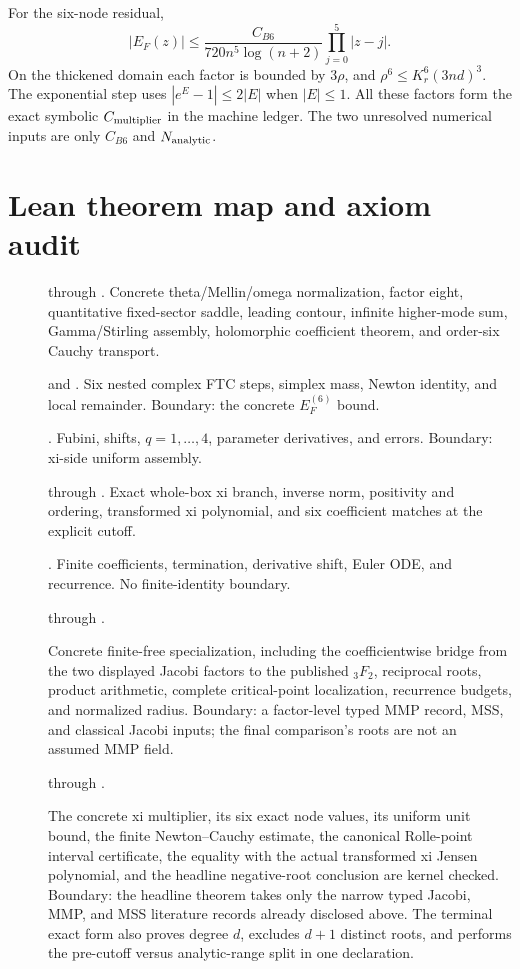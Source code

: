 \documentclass[10pt]{article}
\begin{document}
For the six-node residual,
\[
 |E_F(z)|\le\frac{C_{B6}}{720n^5\log(n+2)}
 \prod_{j=0}^{5}|z-j|.
\]
On the thickened domain each factor is bounded by $3\rho$, and
$\rho^6\le K_r^6(3nd)^3$.  The exponential step uses
$|e^E-1|\le2|E|$ when $|E|\le1$.  All these factors form the exact symbolic
$C_{\rm multiplier}$ in the machine ledger.  The two unresolved numerical
inputs are only $C_{B6}$ and $N_{\rm analytic}$.

\section{Lean theorem map and axiom audit}\label{sup:lean}

\begin{description}
\item[] through .
Concrete theta/Mellin/omega normalization, factor eight, quantitative
fixed-sector saddle, leading contour, infinite higher-mode sum, Gamma/Stirling
assembly, holomorphic coefficient theorem, and order-six Cauchy transport.
\item[] and
.
Six nested complex FTC steps, simplex mass, Newton identity, and local
remainder. Boundary: the concrete $E_F^{(6)}$ bound.
\item[]. Fubini, shifts, $q=1,\ldots,4$,
parameter derivatives, and errors. Boundary: xi-side uniform assembly.
\item[] through .
Exact whole-box xi branch, inverse norm, positivity and ordering, transformed
xi polynomial, and six coefficient matches at the explicit cutoff.
\item[]. Finite coefficients, termination,
derivative shift, Euler ODE, and recurrence. No finite-identity boundary.
\item[] through
.\par
Concrete finite-free specialization, including the coefficientwise bridge
from the two displayed Jacobi factors to the published ${}_3F_2$, reciprocal
roots, product arithmetic, complete critical-point localization, recurrence
budgets, and normalized radius. Boundary: a factor-level typed MMP record,
MSS, and classical Jacobi inputs; the final comparison's roots are not an
assumed MMP field.
\item[] through
.\par
The concrete xi multiplier, its six exact node values, its uniform unit
bound, the finite Newton--Cauchy estimate, the canonical Rolle-point
interval certificate, the equality with the actual transformed xi Jensen
polynomial, and the headline negative-root conclusion are kernel checked.
Boundary: the headline theorem takes only the narrow typed Jacobi, MMP, and
MSS literature records already disclosed above.  The terminal exact form
also proves degree $d$, excludes $d+1$ distinct roots, and performs the
pre-cutoff versus analytic-range split in one declaration.
\end{description}
\end{document}
